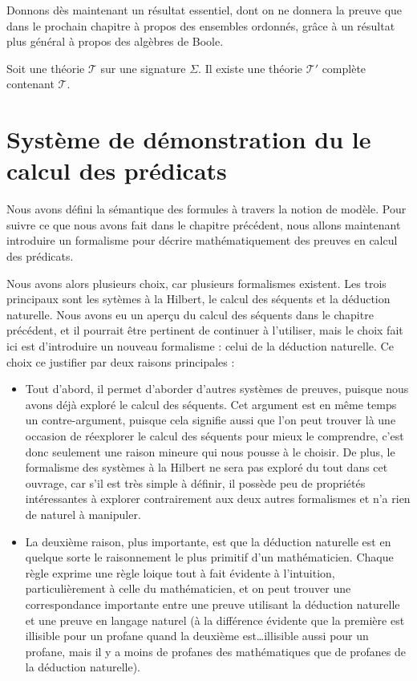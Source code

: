 Donnons dès maintenant un résultat essentiel, dont on ne donnera la preuve que
dans le prochain chapitre à propos des ensembles ordonnés, grâce à un résultat
plus général à propos des algèbres de Boole.

\begin{theorem}
  Soit une théorie $\mathcal T$ sur une signature $\Sigma$. Il existe une théorie
  $\mathcal T'$ complète contenant $\mathcal T$.
\end{theorem}

\section[Syntaxe de preuves]{Système de démonstration du le calcul des prédicats}

Nous avons défini la sémantique des formules à travers la notion de modèle. Pour
suivre ce que nous avons fait dans le chapitre précédent, nous allons maintenant
introduire un formalisme pour décrire mathématiquement des preuves en calcul des
prédicats.

Nous avons alors plusieurs choix, car plusieurs formalismes existent. Les trois
principaux sont les sytèmes à la Hilbert, le calcul des séquents et la déduction
naturelle. Nous avons eu un aperçu du calcul des séquents dans le chapitre
précédent, et il pourrait être pertinent de continuer à l'utiliser, mais le choix
fait ici est d'introduire un nouveau formalisme : celui de la déduction
naturelle. Ce choix ce justifier par deux raisons principales :
\begin{itemize}
\item Tout d'abord, il permet d'aborder d'autres systèmes de preuves, puisque
  nous avons déjà exploré le calcul des séquents. Cet argument est en même temps
  un contre-argument, puisque cela signifie aussi que l'on peut trouver là une
  occasion de réexplorer le calcul des séquents pour mieux le comprendre, c'est
  donc seulement une raison mineure qui nous pousse à le choisir. De plus, le
  formalisme des systèmes à la Hilbert ne sera pas exploré du tout dans cet
  ouvrage, car s'il est très simple à définir, il possède peu de propriétés
  intéressantes à explorer contrairement aux deux autres formalismes et n'a rien
  de naturel à manipuler.
\item La deuxième raison, plus importante, est que la déduction naturelle est en
  quelque sorte le raisonnement le plus primitif d'un mathématicien. Chaque règle
  exprime une règle loique tout à fait évidente à l'intuition, particulièrement
  à celle du mathématicien, et on peut trouver une correspondance importante
  entre une preuve utilisant la déduction naturelle et une preuve en langage
  naturel (à la différence évidente que la première est illisible pour un profane
  quand la deuxième est\ldots illisible aussi pour un profane, mais il y a moins
  de profanes des mathématiques que de profanes de la déduction naturelle).
\end{itemize}

